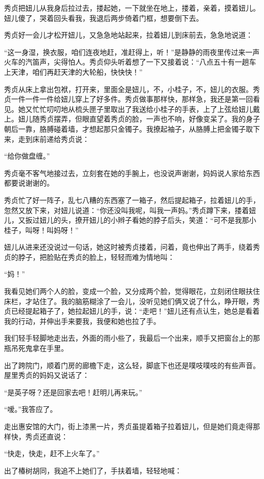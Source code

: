 \par 秀贞把妞儿从我身后拉过去，搂起她，一下就坐在地上，搂着，亲着，摸着妞儿。妞儿傻了，哭着回头看我，我退后两步倚着门框，想要倒下去。
\par 秀贞好一会儿才松开妞儿，又急急地站起来，拉着妞儿到床前去，急急地说道：
\par “这一身湿，换衣服，咱们连夜地赶，准赶得上，听！”是静静的雨夜里传过来一声火车的汽笛声，尖得怕人。秀贞仰头听着想了一下又接着说：“八点五十有一趟车上天津，咱们再赶天津的大轮船，快快快！”
\par 秀贞从床上拿出包袱，打开来，里面全是妞儿，不，小桂子，不，妞儿的衣服。秀贞一件一件一件给妞儿穿上了好多件。秀贞做事那样快，那样急，我还是第一回看见。她又忙忙叨叨地从梳头匣子里取出了我送给小桂子的手表，上了上弦给妞儿戴上。妞儿随秀贞摆弄，但眼直望着秀贞的脸，一声也不响，好像变呆了。我的身子朝后一靠，胳膊碰着墙，才想起那只金镯子。我撩起袖子，从胳膊上把金镯子取下来，走到床前递给秀贞说：
\par “给你做盘缠。”
\par 秀贞毫不客气地接过去，立刻套在她的手腕上，也没说声谢谢，妈妈说人家给东西都要说谢谢的。
\par 秀贞忙了好一阵子，乱七八糟的东西塞了一箱子，然后提起箱子，拉着妞儿的手，忽然又放下来，对妞儿说道：“你还没叫我呢，叫我一声妈。”秀贞蹲下来，搂着妞儿，又扳过妞儿的头，撩开妞儿的小辫子看她的脖子后头，笑道：“可不是我那小桂子，叫呀！叫妈呀！”
\par 妞儿从进来还没说过一句话，她这时被秀贞搂着，问着，竟也伸出了两手，绕着秀贞的脖子，把脸贴在秀贞的脸上，轻轻而难为情地叫：
\par “妈！”
\par 我看见她们两个人的脸，变成一个脸，又分成两个脸，觉得眼花，立刻闭住眼扶住床栏，才站住了。我的脑筋糊涂了一会儿，没听见她们俩又说了什么，睁开眼，秀贞已经提起箱子了，她拉起妞儿的手，说：“走吧！”妞儿还有点认生，她总是看着我的行动，并伸出手来要我，我便和她也拉了手。
\par 我们轻手轻脚地走出去，外面的雨小些了，我最后一个出来，顺手又把窗台上的那瓶吊死鬼拿在手里。
\par 出了跨院门，顺着门房的廊檐下走，这么轻，脚底下也还是噗吱噗吱的有些声音。屋里秀贞的妈妈又说话了：
\par “是英子呀？还是回家去吧！赶明儿再来玩。”
\par “嗳。”我答应了。
\par 走出惠安馆的大门，街上漆黑一片，秀贞虽提着箱子拉着妞儿，但是她们竟走得那样快，秀贞还直说：
\par “快走，快走，赶不上火车了。”
\par 出了椿树胡同，我追不上她们了，手扶着墙，轻轻地喊：
